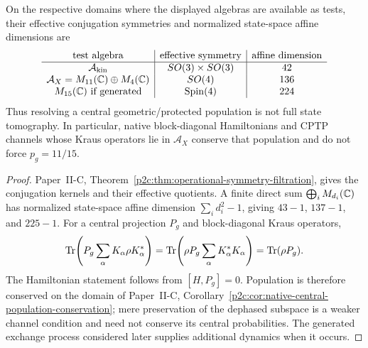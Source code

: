 \documentclass[12pt,a4paper]{article}
\begin{document}
\begin{corollary}
\label{p4:cor:operational-symmetry-state-dimensions}
On the respective domains where the displayed algebras are available as
tests, their effective conjugation symmetries and normalized state-space
affine dimensions are
\[
\begin{array}{c|c|c}
\text{test algebra}&\text{effective symmetry}&\text{affine dimension}\\\hline
\mathcal A_{\rm kin}&SO(3)\times SO(3)&42\\
\mathcal A_X=M_{11}(\mathbb{C})\oplus M_4(\mathbb{C})&SO(4)&136\\
M_{15}(\mathbb{C})\ \text{if generated}&\mathrm{Spin}(4)&224
\end{array}
\]
Thus resolving a central geometric/protected population is not full state
tomography.  In particular, native block-diagonal Hamiltonians and CPTP
channels whose Kraus operators lie in \(\mathcal A_X\) conserve that
population and do not force \(p_g=11/15\).
\end{corollary}

\begin{proof}
Paper~II-C, Theorem~\ref{p2c:thm:operational-symmetry-filtration}, gives
the conjugation kernels and their effective quotients.  A finite direct sum
\(\bigoplus_iM_{d_i}(\mathbb{C})\) has normalized state-space affine dimension
\(\sum_i d_i^2-1\), giving \(43-1\), \(137-1\), and \(225-1\).
For a central projection \(P_g\) and block-diagonal Kraus operators,
\[
 \operatorname{Tr}\!\left(P_g\sum_\alpha K_\alpha\rho K_\alpha^*\right)
 =\operatorname{Tr}\!\left(\rho P_g\sum_\alpha K_\alpha^*K_\alpha\right)
 =\operatorname{Tr}(\rho P_g).
\]
The Hamiltonian statement follows from \([H,P_g]=0\).  Population is
therefore conserved on the domain of
Paper~II-C, Corollary~\ref{p2c:cor:native-central-population-conservation};
mere preservation of the dephased subspace is a weaker channel condition
and need not conserve its central probabilities.  The generated exchange
process considered later supplies additional dynamics when it occurs.
\end{proof}
\end{document}

